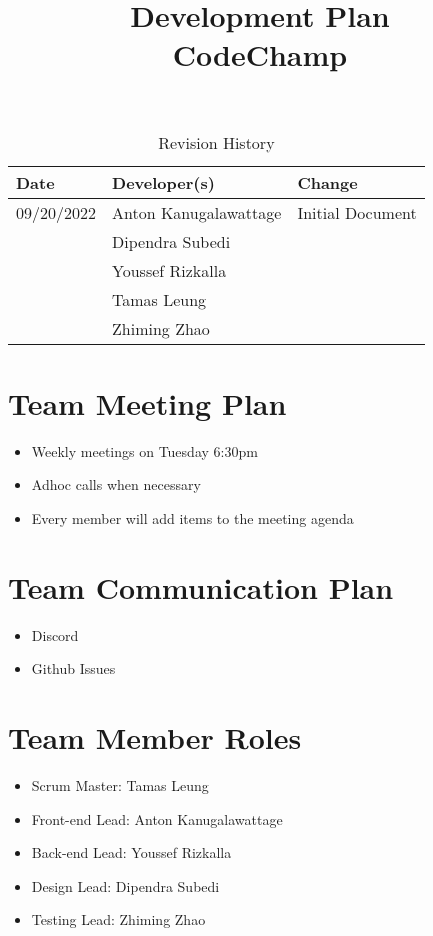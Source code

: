 \documentclass{article}
\title{Development Plan\\CodeChamp}
\author{\authname}
\date{}
\begin{document}
\begin{table}[hp]
\caption{Revision History} \label{TblRevisionHistory}
\begin{tabularx}{\textwidth}{llX}
\toprule
\textbf{Date} & \textbf{Developer(s)} & \textbf{Change}\\
\midrule
09/20/2022 & Anton Kanugalawattage & Initial Document\\
  & Dipendra Subedi & \\
  & Youssef Rizkalla &\\
  & Tamas Leung & \\
  & Zhiming Zhao & \\
\bottomrule
\end{tabularx}
\end{table}

\newpage

\maketitle


\section{Team Meeting Plan}
\begin{itemize}
\item Weekly meetings on Tuesday 6:30pm
\item Adhoc calls when necessary
\item Every member will add items to the meeting agenda
\end{itemize}

\section{Team Communication Plan}
\begin{itemize}
\item Discord
\item Github Issues
\end{itemize}

\section{Team Member Roles}
\begin{itemize}
\item Scrum Master: Tamas Leung
\item Front-end Lead: Anton Kanugalawattage
\item Back-end Lead: Youssef Rizkalla
\item Design Lead: Dipendra Subedi
\item Testing Lead: Zhiming Zhao
\end{itemize}
\end{document}
